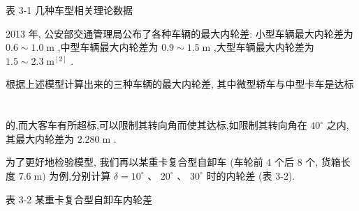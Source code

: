\documentclass[10pt]{article}
\begin{document}
表 3-1 几种车型相关理论数据

\begin{center}
\end{center}

2013 年, 公安部交通管理局公布了各种车辆的最大内轮差: 小型车辆最大内轮差为 \({0.6} \sim  {1.0}\mathrm{\;m}\) ,中型车辆最大内轮差为 \({0.9} \sim  {1.5}\mathrm{\;m}\) ,大型车辆最大内轮差为 \({1.5} \sim  {2.3}{\mathrm{\;m}}^{\left\lbrack  2\right\rbrack  }\) .

根据上述模型计算出来的三种车辆的最大内轮差, 其中微型轿车与中型卡车是达标

\section*{}

的,而大客车有所超标,可以限制其转向角而使其达标,如限制其转向角在 \({40}^{ \circ  }\) 之内,其最大内轮差为 \({2.280}\mathrm{\;m}\) .

为了更好地检验模型, 我们再以某重卡复合型自卸车 (车轮前 4 个后 8 个, 货箱长度 \({7.6}\mathrm{\;m})\) 为例,分别计算 \(\delta  = {10}^{ \circ  }\text{ 、 }{20}^{ \circ  }\text{ 、 }{30}^{ \circ  }\) 时的内轮差 (表 3-2).

表 3-2 某重卡复合型自卸车内轮差

\begin{center}
\end{center}
\end{document}
